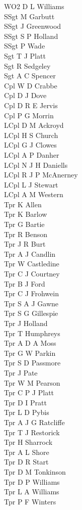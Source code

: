 \begin{multicols}{3}
  \footnotesize
  \noindent
  WO2 D L Williams \\
  SSgt M Garbutt \\
  SSgt J Greenwood \\
  SSgt S P Holland \\
  SSgt P Wade \\
  Sgt T J Platt \\
  Sgt R Sedgeley \\
  Sgt A C Spencer \\
  Cpl W D Crabbe \\
  Cpl D J Dove \\
  Cpl D R E Jervis \\
  Cpl P G Morrin \\
  LCpl D M Ackroyd \\
  LCpl H S Church \\
  LCpl G J Clowes \\
  LCpl A P Danher \\
  LCpl N J H Daniells \\
  LCpl R J P McAnerney \\
  LCpl L J Stewart \\
  LCpl A M Western \\
  Tpr K Allen \\
  Tpr K Barlow \\
  Tpr G Bartie \\
  Tpr R Benson \\
  Tpr J R Burt \\
  Tpr A J Candlin \\
  Tpr W Castledine \\
  Tpr C J Courtney \\
  Tpr B J Ford \\
  Tpr C J Frohwein \\
  Tpr S A J Gawne \\
  Tpr S G Gillespie \\
  Tpr J Holland \\
  Tpr T Humphreys \\
  Tpr A D A Moss \\
  Tpr G W Parkin \\
  Tpr S D Passmore \\
  Tpr J Pate \\
  Tpr W M Pearson \\
  Tpr C P J Platt \\
  Tpr D I Pratt \\
  Tpr L D Pybis \\
  Tpr A J G Ratcliffe \\
  Tpr T J Restorick \\
  Tpr H Sharrock \\
  Tpr A L Shore \\
  Tpr D R Start \\
  Tpr D M Tonkinson \\
  Tpr D P Williams \\
  Tpr L A Williams \\
  Tpr P F Winters \\
\end{multicols}

